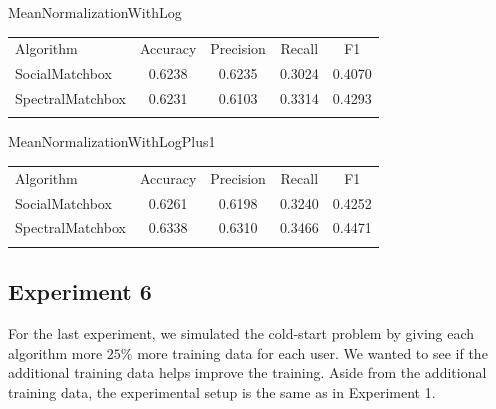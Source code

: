 MeanNormalizationWithLog
\begin{table}
\begin{tabular}{ l  c  c  c  c }
\hline\noalign{\smallskip}
Algorithm & Accuracy & Precision & Recall & F1 \\
 \noalign{\smallskip}\hline\noalign{\smallskip}
SocialMatchbox & 0.6238 & 0.6235 & 0.3024 & 0.4070 \\
SpectralMatchbox & 0.6231 & 0.6103 & 0.3314 & 0.4293 \\
\noalign{\smallskip}\hline
\end{tabular} 
\end{table}

MeanNormalizationWithLogPlus1
\begin{table}
\begin{tabular}{l  c  c  c  c }
\hline\noalign{\smallskip}
Algorithm & Accuracy & Precision & Recall & F1 \\
  \noalign{\smallskip}\hline\noalign{\smallskip}
SocialMatchbox & 0.6261 & 0.6198 & 0.3240 & 0.4252 \\
SpectralMatchbox & 0.6338 & 0.6310 &  0.3466 & 0.4471 \\
\noalign{\smallskip}\hline
\end{tabular} 
\end{table}


\subsection{Experiment 6}
\label{sec:2}

For the last experiment, we simulated the cold-start problem by giving each algorithm more $25\%$ more training data for each user. We wanted to see if the additional training data helps improve the training. Aside from the additional training data, the experimental setup is the same as in Experiment 1.

